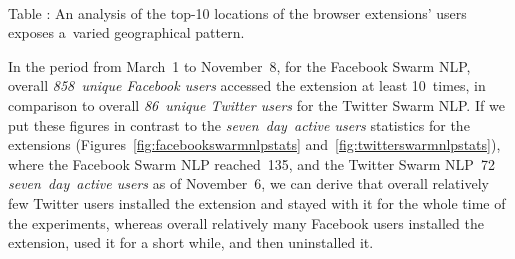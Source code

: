 \documentclass{iosart2c}
\newcommand{\tablecaption}[1]{%
  \\[1em]%
  \refstepcounter{table}%
  Table \arabic{table}: #1%
}
\begin{document}
\begin{table}
  \centering
  \qquad
  \tablecaption{An analysis of the top-10 locations of the browser extensions' users exposes a~varied geographical pattern.}
  \label{tbl:locations}
\end{table}

In the period from March~1 to November~8, for the Facebook Swarm NLP, overall \emph{858~unique Facebook users} accessed the extension at least 10~times, in comparison to overall \emph{86~unique Twitter users} for the Twitter Swarm NLP.
If we put these figures in contrast to the \emph{seven~day~active users} statistics for the extensions (Figures~\ref{fig:facebookswarmnlpstats} and~\ref{fig:twitterswarmnlpstats}), where the Facebook Swarm NLP reached~135, and the Twitter Swarm NLP~72 \emph{seven~day~active users} as of November~6, we can derive that overall relatively few Twitter users installed the extension and stayed with it for the whole time of the experiments, whereas overall relatively many Facebook users installed the extension, used it for a short while, and then uninstalled it.
\end{document}
